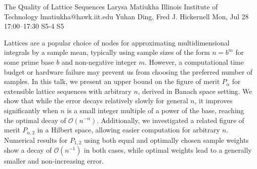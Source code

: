 \begin{talk}
  {The Quality of Lattice Sequences}%
  {Larysa Matiukha}%
  {Illinois Institute of Technology}%
  {lmatiukha@hawk.iit.edu}%
  {Yuhan Ding, Fred J. Hickernell}%
  {}%
  {Mon, Jul 28 17:00--17:30}%
  {S5-4}%
  {S5}%
  
    

Lattices are a popular choice of nodes for approximating multidimensional integrals by a sample mean, typically using sample sizes of the form $n = b^m$ for some prime base $b$ and non-negative integer $m$. However, a computational time budget or hardware failure may prevent us from choosing the preferred number of samples. In this talk, we present an upper bound on the figure of merit $P_\alpha$ for extensible lattice sequences with arbitrary $n$, derived in Banach space setting. We show that while the error decays relatively slowly for general $n$, it improves significantly when $n$ is a small integer multiple of a power of the base, reaching the optimal decay of $\mathcal{O}(n^{-\alpha})$. %
Additionally, we investigated a related figure of merit $P_{\alpha,2}$ in a Hilbert space, allowing easier computation for arbitrary $n$. Numerical results for $P_{1,2}$ using both equal and optimally chosen sample weights show a decay of $\mathcal{O}(n^{-1})$ in both cases, while optimal weights lead to a generally smaller and non-increasing error. 





\end{talk}

